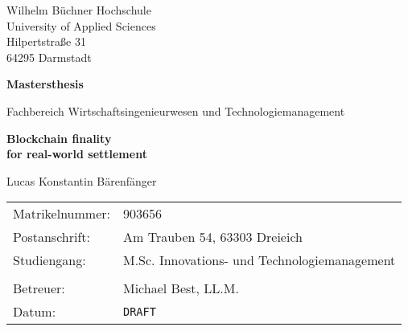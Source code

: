 \begin{titlepage}

	\large
	Wilhelm Büchner Hochschule \\
	University of Applied Sciences \\
	Hilpertstraße 31 \\
	64295 Darmstadt

	\vfill

	\begin{center}
		\Large
			\textbf{Mastersthesis}

			\vspace{0.5cm}

			Fachbereich Wirtschaftsingenieurwesen und Technologiemanagement

			\vfill

		\Huge
			\textbf{
				Blockchain finality \\
				for real-world settlement
			}

			\vfill

		\Large
			Lucas Konstantin Bärenfänger
	\end{center}

	\vfill
	
	\begin{tabularx}{\textwidth}{@{}l X}
		Matrikelnummer: & 903656 \\
		Postanschrift:  & Am Trauben 54, 63303 Dreieich \\
		Studiengang:    & M.Sc. Innovations- und Technologiemanagement \\
        \\
		Betreuer:       & Michael Best, LL.M. \\
		Datum:          & \texttt{DRAFT}
	\end{tabularx}

\end{titlepage}
